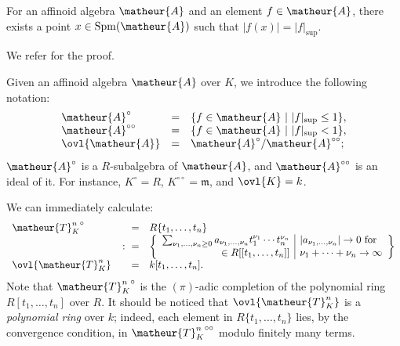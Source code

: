 \begin{appthm}
For an affinoid algebra 
$\matheur{A}$ and an element $f\in\matheur{A}$, there exists a point
$x\in\mathrm{Spm}(\matheur{A})$ such that $|f(x)|=|f|_{\mathrm{sup}}$.
\end{appthm}

We refer \cite[6.2.1]{na} for the proof.

Given an affinoid algebra $\matheur{A}$ over $K$, we introduce the following
notation:
\begin{equation*}
 \begin{array}{lcl}
 \matheur{A}^{\circ}&=&\{f\in\matheur{A}\ |\ |f|_{\mathrm{sup}}\leq 1\},\\
 \matheur{A}^{\circ\circ}&=&\{f\in\matheur{A}\ |\ |f|_{\mathrm{sup}}<1\},\\
 \ovl{\matheur{A}}&=&\matheur{A}^{\circ}/\matheur{A}^{\circ\circ};
 \end{array}
\end{equation*}
$\matheur{A}^{\circ}$ is a $R$-subalgebra of $\matheur{A}$, and 
$\matheur{A}^{\circ\circ}$ is an ideal of it.
For instance, $K^{\circ}=R$, $K^{\circ\circ}=\mathfrak{m}$, and $\ovl{K}=k$.

\begin{appexa}\label{exa-red-tate}
We can immediately calculate:
$$
\begin{array}{lrl}
{\matheur{T}^n_K}^{\circ}&=&R\{t_1,\ldots,t_n\}\\
&\colon=&\left\{
\begin{array}{r|l}
\sum_{\nu_1,\ldots,\nu_n\geq 0}
a_{\nu_1,\ldots,\nu_n}t_1^{\nu_1}\cdots t_n^{\nu_n}&
|a_{\nu_1,\ldots,\nu_n}|\rightarrow 0\ \mathrm{for}\\
\in R[[t_1,\ldots,t_n]]
&\nu_1+\cdots+\nu_n\rightarrow\infty
\end{array}
\right\}\\
\ovl{\matheur{T}^n_K}&=&k[t_1,\ldots,t_n].
\end{array}
$$
Note that ${\matheur{T}^n_K}^{\circ}$ is the $(\pi)$-adic completion of
the polynomial ring $R[t_1,\ldots,t_n]$ over $R$.
It should be noticed that $\ovl{\matheur{T}^n_K}$ is a 
{\it polynomial ring} over $k$; indeed, each element in
$R\{t_1,\ldots,t_n\}$ lies, by the convergence condition, in 
${\matheur{T}^n_K}^{\circ\circ}$ modulo finitely many terms.
\end{appexa}

